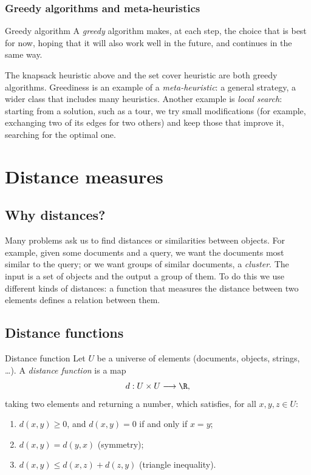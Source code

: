 \documentclass[a4paper,12pt,oneside]{report}
\begin{document}
\subsection{Greedy algorithms and meta-heuristics}

\begin{frameddefn}{Greedy algorithm}\label{def:greedy}
A \emph{greedy} algorithm makes, at each step, the choice that is best
for now, hoping that it will also work well in the future, and
continues in the same way.
\end{frameddefn}

The knapsack heuristic above and the set cover heuristic are both
greedy algorithms. Greediness is an example of a \emph{meta-heuristic}:
a general strategy, a wider class that includes many heuristics.
Another example is \emph{local search}: starting from a solution, such
as a tour, we try small modifications (for example, exchanging two of
its edges for two others) and keep those that improve it, searching
for the optimal one.

\chapter{Distance measures}

\section{Why distances?}

Many problems ask us to find distances or similarities between
objects. For example, given some documents and a query, we want the
documents most similar to the query; or we want groups of similar
documents, a \emph{cluster}. The input is a set of objects and the
output a group of them. To do this we use different kinds of
distances: a function that measures the distance between two elements
defines a relation between them.

\section{Distance functions}

\begin{frameddefn}{Distance function}\label{def:distance}
Let $U$ be a universe of elements (documents, objects, strings, \ldots).
A \emph{distance function} is a map
\[
  d:U\times U\longrightarrow\R,
\]
taking two elements and returning a number, which satisfies, for all
$x,y,z\in U$:
\begin{enumerate}
  \item $d(x,y)\geq0$, and $d(x,y)=0$ if and only if $x=y$;
  \item $d(x,y)=d(y,x)$ (symmetry);
  \item $d(x,y)\leq d(x,z)+d(z,y)$ (triangle inequality).
\end{enumerate}
\end{frameddefn}
\end{document}
